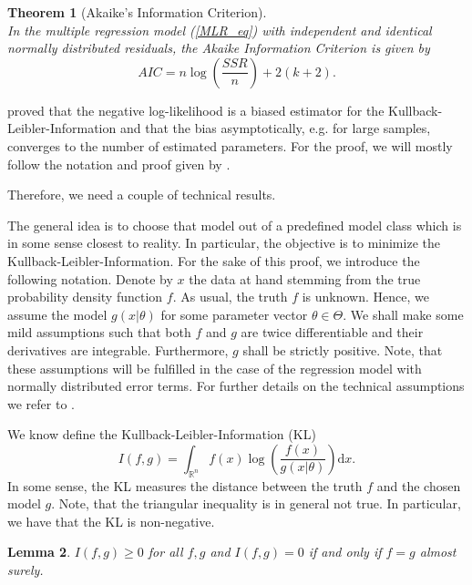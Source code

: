 \documentclass[a4paper, 11pt]{scrreprt}
\newtheorem{Theorem}{Theorem}[chapter]
\newtheorem{Lemma}[Theorem]{Lemma}
\newcommand{\RR}{\mathbb{R}}
\begin{document}
\begin{Theorem}[Akaike's Information Criterion] \label{AIC_thm} $\text{ }$ \\ \upshape 
In the multiple regression model (\ref{MLR_eq}) with independent and identical normally distributed residuals, the Akaike Information Criterion is given by
\begin{equation}\label{AIC_eq}
AIC = n\log\left(\frac{SSR}{n}\right) + 2(k+2).
\end{equation}
\end{Theorem}


\textcite{akaike1973information} proved that the negative log-likelihood is a biased estimator for the Kullback-Leibler-Information and that the bias asymptotically, e.g. for large samples, converges to the number of estimated parameters.
For the proof, we will mostly follow the notation and proof given by \textcite[chapter 7.2]{burnham2003model}. 

Therefore, we need a couple of technical results.

\medskip
The general idea is to choose that model out of a predefined model class which is in some sense closest to reality. 
In particular, the objective is to minimize the Kullback-Leibler-Information.
For the sake of this proof, we introduce the following notation. Denote by $x$ the data at hand stemming from the true probability density function $f$. As usual, the truth $f$ is unknown. Hence, we assume the model $g(x | \theta)$ for some parameter vector $\theta \in \Theta$.
We shall make some mild assumptions such that both $f$ and $g$ are twice differentiable and their derivatives are integrable. Furthermore, $g$ shall be strictly positive. Note, that these assumptions will be fulfilled in the case of the regression model with normally distributed error terms. For further details on the technical assumptions we refer to \textcite[p. 3-4]{shibata1989statistical}.

We know define the Kullback-Leibler-Information (KL)
\begin{equation}\label{KL}
I(f,g) = \int_{\RR^n} f(x) \log\left( \frac{f(x)}{g(x|\theta)} \right)\mathrm{d}x.
\end{equation}
In some sense, the KL measures the distance between the truth $f$ and the chosen model $g$. Note, that the triangular inequality is in general not true. In particular, we have that the KL is non-negative.

\begin{Lemma} \upshape $I(f,g) \geq 0$ for all $f,g$ and $I(f,g) = 0$ if and only if $f=g$ almost surely.
\end{Lemma}
\end{document}

